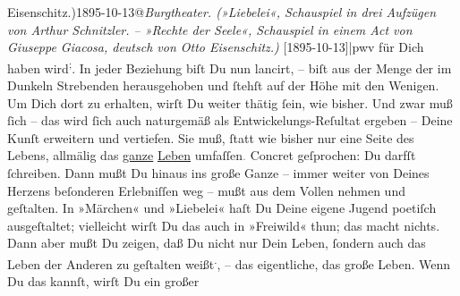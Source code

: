 \begin{ledgroupsized}[t]{13cm}
{                  Eisenschitz.)1895-10-13@\emph{Burgtheater. (»Liebelei«, Schauspiel in drei Aufzügen von Arthur Schnitzler. – »Rechte der Seele«, Schauspiel in einem Act von Giuseppe Giacosa, deutsch von Otto Eisenschitz.)} {[}1895-10-13{]}|pwv} für Dich haben wird\substVorne{}\textsuperscript{;}\substDazwischen{}.\substHinten{} In jeder Beziehung biſt Du nun lancirt, – biſt aus der Menge der im Dunkeln
               Strebenden herausgehoben und ſtehſt auf der Höhe mit den Wenigen.\pend
           \pstart
           Um Dich dort zu erhalten, wirſt Du weiter thätig ſein, wie bisher. Und zwar muß ſich
               – das wird {\pb}ſich auch naturgemäß als
               Entwickelungs-Reſultat ergeben – Deine Kunſt erweitern und vertiefen. Sie muß, ſtatt
               wie bisher nur eine Seite des Lebens, allmälig das \uline{ganze}{ }\uline{Leben} umfaſſen\textcolor{gray}{.} Concret  geſprochen: Du darfſt \label{K_L02753-55v}\label{K_L02753-55h} ſchreiben. Dann mußt Du hinaus ins große Ganze – immer weiter von Deines
               Herzens beſonderen Erlebniſſen weg – mußt aus dem Vollen {\pb}nehmen und geſtalten. In »Märchen« und »Liebelei«
               haſt Du Deine eigene Jugend poetiſch ausgeſtaltet; vielleicht wirſt Du das auch in
                  »Freiwild« thun; das macht nichts. Dann aber
               mußt Du zeigen, daß Du nicht nur Dein Leben, ſondern auch das Leben  der Anderen zu geſtalten weißt\substVorne{}\textsuperscript{.}\substDazwischen{},\substHinten{} – das eigentliche, das große Leben. Wenn Du das kannſt, wirſt Du ein großer

\end{ledgroupsized}
